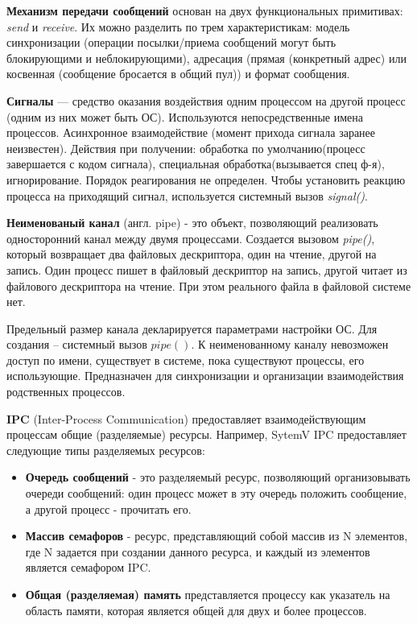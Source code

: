 \textbf{Механизм передачи сообщений} основан на двух функциональных примитивах: \textit{send} и \textit{receive}. Их можно разделить по трем характеристикам: модель синхронизации (операции посылки/приема сообщений могут быть блокирующими и неблокирующими), адресация (прямая (конкретный адрес) или косвенная (сообщение бросается в общий пул)) и формат сообщения.   

\textbf{Сигналы} --- средство оказания воздействия одним процессом на другой процесс (одним из них может быть ОС). Используются непосредственные имена процессов. Асинхронное взаимодействие (момент прихода сигнала заранее неизвестен). Действия при получении: обработка по умолчанию(процесс завершается с кодом сигнала), специальная обработка(вызывается спец ф-я), игнорирование. Порядок реагирования не определен. Чтобы установить реакцию процесса на приходящий сигнал, используется системный вызов \textit{signal()}.

\textbf{Неименованый канал} (англ. pipe) - это объект, позволяющий реализовать односторонний канал между двумя процессами. Создается вызовом \textit{pipe()}, который возвращает два файловых дескриптора, один на чтение, другой на запись. Один процесс пишет в файловый дескриптор на запись, другой читает из файлового дескриптора на чтение. При этом реального файла в файловой системе нет.

Предельный размер канала декларируется параметрами настройки ОС. Для создания -- системный вызов $pipe()$. К неименованному каналу невозможен доступ по имени, существует в системе, пока существуют процессы, его использующие. Предназначен для синхронизации и организации взаимодействия родственных процессов.

\textbf{IPC} (Inter-Process Communication) предоставляет взаимодействующим процессам общие (разделяемые) ресурсы.
Например, SytemV IPC предоставляет следующие типы разделяемых ресурсов:
\begin{itemize}
    \item \textbf{Очередь сообщений} - это разделяемый ресурс, позволяющий организовывать очереди сообщений: один процесс может в эту очередь положить сообщение, а другой процесс - прочитать его.
    \item \textbf{Массив семафоров} - ресурс, представляющий собой массив из N элементов, где N задается при создании данного ресурса, и каждый из элементов является семафором IPC.
    \item \textbf{Общая (разделяемая) память} представляется процессу как указатель на область памяти, которая является общей для двух и более процессов.
\end{itemize}


